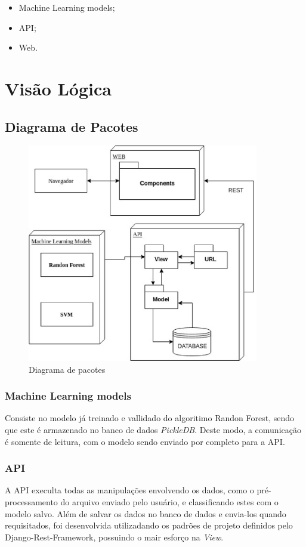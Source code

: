 \begin{anexosenv}
	\begin{itemize}
		\item Machine Learning models;
		\item API;
		\item Web.
	\end{itemize}


    \section{Visão Lógica}
    \subsection{Diagrama de Pacotes}
    \begin{figure}[!htb]
		\centering
		\includegraphics[width=0.9\textwidth]{figuras/diagrama_pacotes.eps}
		\caption{Diagrama de pacotes}
		\label{diagramadepacotes}
	\end{figure}
	\subsubsection{Machine Learning models}
	Consiste no modelo já treinado e vallidado do algoritimo Randon Forest, sendo que este é armazenado no banco de dados \textit{PickleDB}. Deste modo, a comunicação é somente de leitura, com o modelo sendo enviado por completo para a API.
	\subsubsection{API}
	A API execulta todas as manipulações envolvendo os dados, como o pré-processamento do arquivo enviado pelo usuário, e classificando estes com o modelo salvo. Além de salvar os dados no banco de dados e envia-los quando requisitados, foi desenvolvida utilizadando os padrões de projeto definidos pelo Django-Rest-Framework, possuindo o mair esforço na \textit{View}.


\end{anexosenv}
